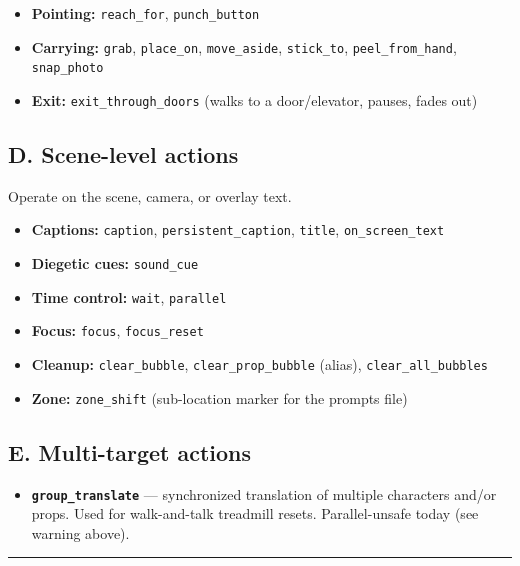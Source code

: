 \documentclass[
  11pt,
]{book}
\providecommand{\tightlist}{%
  \setlength{\itemsep}{0pt}\setlength{\parskip}{0pt}}
\begin{document}
\begin{itemize}
\tightlist
\item
  \textbf{Pointing:} \texttt{reach\_for}, \texttt{punch\_button}
\item
  \textbf{Carrying:} \texttt{grab}, \texttt{place\_on},
  \texttt{move\_aside}, \texttt{stick\_to}, \texttt{peel\_from\_hand},
  \texttt{snap\_photo}
\item
  \textbf{Exit:} \texttt{exit\_through\_doors} (walks to a
  door/elevator, pauses, fades out)
\end{itemize}

\subsection{D. Scene-level actions}\label{d.-scene-level-actions}

Operate on the scene, camera, or overlay text.

\begin{itemize}
\tightlist
\item
  \textbf{Captions:} \texttt{caption}, \texttt{persistent\_caption},
  \texttt{title}, \texttt{on\_screen\_text}
\item
  \textbf{Diegetic cues:} \texttt{sound\_cue}
\item
  \textbf{Time control:} \texttt{wait}, \texttt{parallel}
\item
  \textbf{Focus:} \texttt{focus}, \texttt{focus\_reset}
\item
  \textbf{Cleanup:} \texttt{clear\_bubble}, \texttt{clear\_prop\_bubble}
  (alias), \texttt{clear\_all\_bubbles}
\item
  \textbf{Zone:} \texttt{zone\_shift} (sub-location marker for the
  prompts file)
\end{itemize}

\subsection{E. Multi-target actions}\label{e.-multi-target-actions}

\begin{itemize}
\tightlist
\item
  \textbf{\texttt{group\_translate}} --- synchronized translation of
  multiple characters and/or props. Used for walk-and-talk treadmill
  resets. Parallel-unsafe today (see warning above).
\end{itemize}

\begin{center}\rule{0.5\linewidth}{0.5pt}\end{center}
\end{document}
